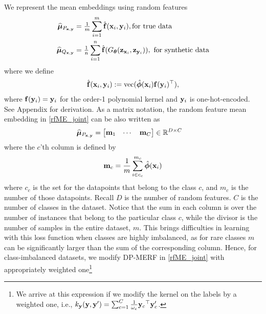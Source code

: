 \documentclass{article}
\begin{document}
We represent the mean embeddings using random features 
\begin{align}\label{eq:rfME_joint}
   \widehat{\mathbf{\bm{\mu}}}_{P_{\mathbf{x}, \mathbf{y}}} & =\tfrac{1}{m}\sum_{i=1}^{m} \hat{\mathbf{f}}(\mathbf{x}_i, \mathbf{y}_i), \mbox{for true data}\\
  \widehat{\mathbf{\bm{\mu}}}_{Q_{\mathbf{x}, \mathbf{y}}}&= \tfrac{1}{n}\sum_{i=1}^{n} \hat{\mathbf{f}}(G_{\mathbf{\bm{\theta}}}(\mathbf{z}_{\mathbf{x}_i}, \mathbf{z}_{\mathbf{y}_i})), \mbox{ for synthetic data} \nonumber 
\end{align} where we define 
\begin{align}
\hat{\mathbf{f}}(\mathbf{x}_i, \mathbf{y}_i) := \mbox{vec}(\hat{\mathbf{\bm{\phi}}}(\mathbf{x}_i) \mathbf{f}(\mathbf{y}_i){^\top}), 
\end{align}
where $\mathbf{f}(\mathbf{y}_i) = \mathbf{y}_i$ for the order-1 polynomial kernel and $\mathbf{y}_i$ is one-hot-encoded. 
%
%
See Appendix for derivation. 
%
As a matrix notation, the random feature mean embedding in \eqref{rfME_joint} can be also written as 
\begin{align}
   \widehat{\mathbf{\bm{\mu}}}_{P_{\mathbf{x}, \mathbf{y}}} &=
    \begin{bmatrix}
\mathbf{m}_1 & \cdots  & \mathbf{m}_C  \\
\end{bmatrix} \in \mathbb{R}^{D \times C} \nonumber
\end{align}\label{eq:rfME_joint_P}
where the $c$'th column is defined by 
\begin{align}\label{eq:mc}
\mathbf{m}_c = \frac{1}{m}\sum_{i \in c_c}^{m_c}\hat{\mathbf{\bm{\phi}}}(\mathbf{x}_i)
\end{align} where $c_c$ is the set for the datapoints that belong to the class $c$, and $m_c$ is the number of those datapoints. Recall $D$ is the number of random features. $C$ is the number of classes in the dataset. 
Notice that the sum in each column is over the number of instances that belong to the particular class $c$, while the divisor is the number of samples in the entire dataset, $m$. This brings difficulties in learning with this loss function when classes are highly  imbalanced, as for rare classes $m$ can be significantly larger than the sum of the corresponding column. 
Hence, for class-imbalanced datasets, we modify DP-MERF in \eqref{rfME_joint} with appropriately 
%
%
{weighted one}\footnote{We arrive at this expression if we modify the kernel on the labels by a weighted one, i.e., $k_{\mathbf{y}}(\mathbf{y},\mathbf{y}') = \sum_{c=1}^C\frac{1}{\omega_c}\mathbf{y}_c{^\top}\mathbf{y}_c'$.} 
\end{document}
